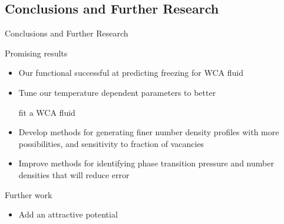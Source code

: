 \documentclass{beamer}
\begin{document}
\subsection*{Conclusions and Further Research}
\begin{frame}{Conclusions and Further Research}
          \begin{block}{Promising results}
            \begin{itemize}
            \item Our functional successful at predicting freezing for WCA fluid
            \item Tune our temperature dependent parameters to better 
            
            fit a WCA fluid
            \item Develop methods for generating finer number density 
            profiles with more possibilities, and sensitivity to fraction of vacancies
            \item Improve methods for identifying phase transition 
            pressure and number densities that will reduce error
            \end{itemize}
          \end{block}
          \begin{block}{Further work}
            \begin{itemize}
              \item Add an attractive potential 
            \end{itemize}
          \end{block}
\end{frame}
\end{document}
